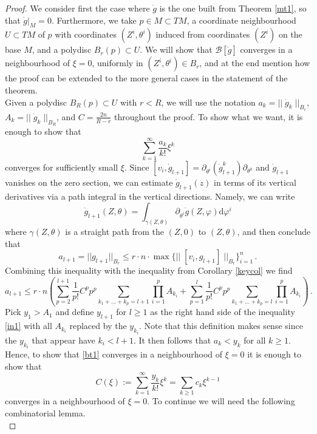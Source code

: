\documentclass{article}
\theoremstyle{definition}
\numberwithin{equation}{section}
\begin{document}
\begin{proof}
    We consider first the case where $\dot{g}$ is the one built from Theorem \ref{mt1}, so that $\dot{g}|_M=0$. Furthermore, we take  $p\in M\subset TM$, a coordinate neighbourhood $U\subset TM$ of $p$ with coordinates $(Z^i,\theta^i)$ induced from coordinates $(Z^i)$ on the base $M$, and a polydisc $B_r(p)\subset U$. We will show that $\mathcal{B}[\dot{g}]$ converges in a neighbourhood of $\xi=0$, uniformly in $(Z^i,\theta^i)\in B_r$, and at the end mention how the proof can be extended to the more general cases in the statement of the theorem. \\
    
    Given a polydisc $B_R(p)\subset U$ with $r<R$, we will use the notation $a_k=|| \; \dot{g}_k \; ||_{B_r},$ $A_k=||\; \dot{g}_k\;||_{B_R} $,  and $C=\frac{2n}{R-r}$ throughout the proof.  To show what we want, it is enough to show that
    \begin{equation}\label{bt1}
        \sum_{k=1}^{\infty}\frac{a_k}{k!}\xi^{k}
    \end{equation} converges for sufficiently small $\xi$. Since $[v_i,\dot{g}_{l+1}]=\partial_{\theta^{i}}(\dot{g}_{l+1}^{k})\partial_{\theta^k}$ and $\dot{g}_{l+1}$ vanishes on the zero section,  we can estimate $\dot{g}_{l+1}(z)$ in terms of its vertical derivatives via a path integral in the vertical directions. Namely, we can  write
    \begin{equation}\label{pathintest}
        \dot{g}_{l+1}(Z,\theta)=\int_{\gamma(Z,\theta)}\partial_{\theta^i}\dot{g}(Z, \varphi)\mathrm{d}\varphi^i
    \end{equation}
    where $\gamma(Z,\theta)$ is a straight path from the $(Z,0)$ to $(Z,\theta)$, and then conclude that   \begin{equation*}
    a_{l+1}=||g_{l+1}||_{B_r}\leq r\cdot n \cdot \max\{||\;[v_i, g_{l+1}]\;||_{B_r}\}_{i=1}^{n}\,.
\end{equation*} 
Combining this inequality with the inequality from Corollary \ref{keycol} we find
\begin{equation}\label{in1}
    a_{l+1} \leq r\cdot n\left(\sum_{p=2}^{l+1}\frac{1}{p!}C^pp^p\sum_{k_1+...+k_p=l+1}\prod_{i=1}^{p}A_{k_i}+\sum_{p=1}^{l}\frac{1}{p!}C^pp^p\sum_{k_1+...+k_p=l}\prod_{i=1}^{p}A_{k_i}\right)\,.
\end{equation}
Pick $y_1>A_1$ and define  $y_{l+1}$ for $l\geq 1$ as the right hand side of the inequality \eqref{in1} with all $A_{k_i}$ replaced by the $y_{k_i}$. Note that this definition makes sense since the $y_{k_i}$ that appear have $k_i<l+1$. It then follows that $a_{k}<y_{k}$ for all $k\geq 1$. Hence, to show that \eqref{bt1} converges in a neighbourhood of $\xi=0$ it is enough to show that 
\begin{equation*}
    C(\xi):=\sum_{k=1}^{\infty}\frac{y_k}{k!}\xi^{k}=\sum_{k\geq 1}c_k\xi^{k-1}
\end{equation*}
converges in a neighbourhood of $\xi=0$. To continue we will need the following combinatorial lemma.\\


\end{proof}
\end{document}
